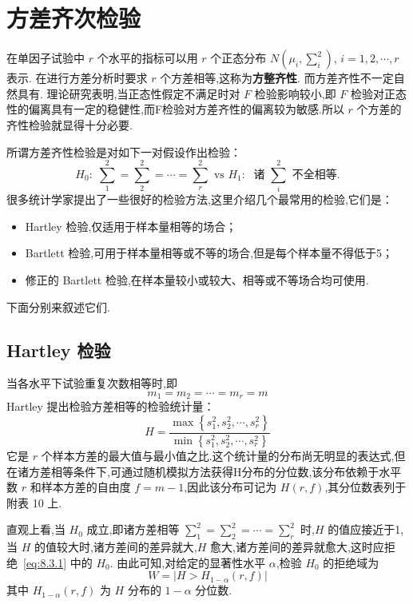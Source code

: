 \section{方差齐次检验}\label{sec:8.3}
在单因子试验中 $r$ 个水平的指标可以用 $r$ 个正态分布 $N(\mu_i,\sum_i^2)$, $i=1,2,\cdots,r$ 表示. 在进行方差分析时要求 $r$ 个方差相等,这称为\textbf{方整齐性}. 而方差齐性不一定自然具有. 理论研究表明,当正态性假定不满足时对 $F$ 检验影响较小,即 $F$ 检验对正态性的偏离具有一定的稳健性,而F检验对方差齐性的偏离较为敏感.所以 $r$ 个方差的齐性检验就显得十分必要.

所谓方差齐性检验是对如下一对假设作出检验：
\begin{equation}\label{eq:8.3.1}
  H_0:\; \sum_1^2 = \sum_2^2 = \cdots = \sum_r^2 \text{ vs } H_1:\; \text{ 诸 } \sum_i^2 \text{ 不全相等}.
\end{equation}
很多统计学家提出了一些很好的检验方法,这里介绍几个最常用的检验,它们是：
\begin{itemize}
  \item Hartley 检验,仅适用于样本量相等的场合；
  \item Bartlett 检验,可用于样本量相等或不等的场合,但是每个样本量不得低于5；
  \item 修正的 Bartlett 检验,在样本量较小或较大、相等或不等场合均可使用.
\end{itemize}

下面分别来叙述它们.
\subsection{Hartley 检验}

当各水平下试验重复次数相等时,即
\begin{equation*}
  m_{1}=m_{2}=\cdots=m_{r}=m
\end{equation*}
Hartley 提出检验方差相等的检验统计量：
\begin{equation}\label{eq:8.3.2}
  H=\frac{\max \left\{s_{1}^{2}, s_{2}^{2}, \cdots, s_{r}^{2}\right\}}{\min \left\{s_{1}^{2}, s_{2}^{2}, \cdots, s_{r}^{2}\right\}}
\end{equation}
它是 $r$ 个样本方差的最大值与最小值之比.这个统计量的分布尚无明显的表达式,但在诸方差相等条件下,可通过随机模拟方法获得H分布的分位数,该分布依赖于水平数 $r$ 和样本方差的自由度 $f=m-1$,因此该分布可记为 $H(r,f)$,其分位数表列于附表 10 上.

直观上看,当 $H_0$ 成立,即诸方差相等 $\sum_1^2 = \sum_2^2= \cdots = \sum_r^2$ 时,$H$ 的值应接近于1,当 $H$ 的值较大时,诸方差间的差异就大,$H$ 愈大,诸方差间的差异就愈大,这时应拒绝~\eqref{eq:8.3.1} 中的 $H_0$. 由此可知,对给定的显著性水平 $\alpha$,检验 $H_0$ 的拒绝域为
\begin{equation}
  W=|H>H_{1-\alpha}(r, f)|
\end{equation}
其中 $H_{1-\alpha}(r,f)$ 为 $H$ 分布的 $1-\alpha$ 分位数.

